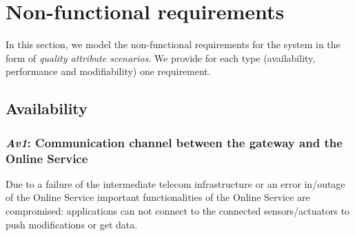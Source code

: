 \documentclass[english]{sareport}
\begin{document}
\chapter{Non-functional requirements}\label{sec:non-functional}
In this section, we model the non-functional requirements for the system in the
form of \emph{quality attribute scenarios}. We provide for each type
(availability, performance and modifiability) one requirement.

\section{Availability}
\subsection{\emph{Av1}: Communication channel between the gateway and the Online Service}
Due to a failure of the intermediate telecom infrastructure or an error in/outage of the Online Service important functionalities of the Online Service are compromised: applications can not connect to the connected sensors/actuators to push modifications or get data.
\end{document}
